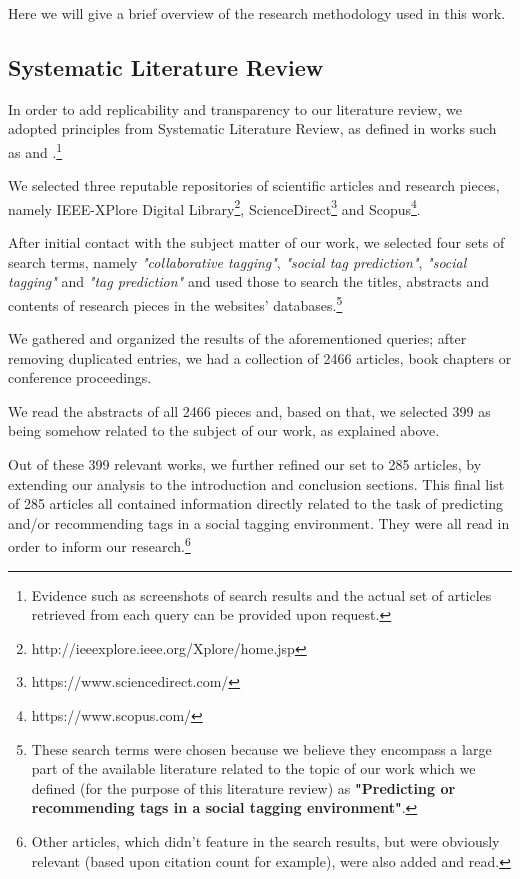 Here we will give a brief overview of the research methodology used in this work.

\subsection{Systematic Literature Review}\label{section:literature_review}

In order to add replicability and transparency to our literature review, we adopted principles from Systematic Literature Review, as defined in works such as \cite{baumeister_leary_1997} and \cite{bem_1995}.\footnote{Evidence such as screenshots of search results and the actual set of articles retrieved from each query can be provided upon request.}

We selected three reputable repositories of scientific articles and research pieces, namely IEEE-XPlore Digital Library\footnote{http://ieeexplore.ieee.org/Xplore/home.jsp}, ScienceDirect\footnote{https://www.sciencedirect.com/} and Scopus\footnote{https://www.scopus.com/}.

After initial contact with the subject matter of our work, we selected four sets of search terms, namely \textit{"collaborative tagging"}, \textit{"social tag prediction"}, \textit{"social tagging"} and \textit{"tag prediction"} and used those to search the titles, abstracts and contents of research pieces in the websites' databases.\footnote{These search terms were chosen because we believe they encompass a large part  of the available literature related to the topic of our work which we defined (for the purpose of this literature review) as \textbf{"Predicting or recommending tags in a social tagging environment"}.} 

We gathered and organized the results of the aforementioned queries; after removing duplicated entries, we had a collection of 2466 articles, book chapters or conference proceedings.

We read the abstracts of all 2466 pieces and, based on that, we selected 399 as being somehow related to the subject of our work, as explained above.

Out of these 399 relevant works, we further refined our set to 285 articles, by extending our analysis to the introduction and conclusion sections. This final list of 285 articles all contained information directly related to the task of predicting and/or recommending tags in a social tagging environment. They were all read in order to inform our research.\footnote{Other articles, which didn't feature in the search results, but were obviously relevant (based upon citation count for example), were also added and read.}


